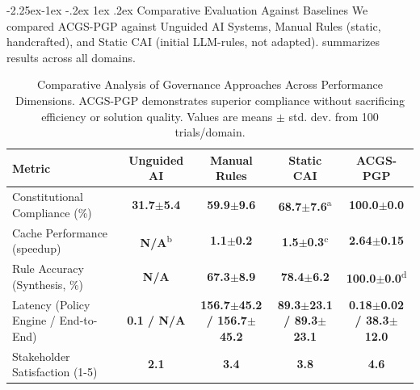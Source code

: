 \documentclass[manuscript,screen,9pt]{acmart}
\makeatletter
\renewcommand\subsection{\@startsection{subsection}{2}{\z@}%
  {-2.25ex\@plus -1ex \@minus -.2ex}%
  {1ex \@plus .2ex}%
  {\normalfont\large\bfseries}}
\newcommand{\tablesize}{\footnotesize}
\newcommand{\tablenumfmt}[1]{\textbf{#1}}
\newcommand{\tableheader}[1]{\textbf{#1}}
\makeatother
\begin{document}
\subsection{Comparative Evaluation Against Baselines}
\label{subsec:comparative_evaluation}
We compared ACGS-PGP against Unguided AI Systems, Manual Rules (static, handcrafted), and Static CAI (initial LLM-rules, not adapted).  summarizes results across all domains.
\begin{table}[htbp]
	\centering
	\caption{Comparative Analysis of Governance Approaches Across Performance Dimensions. ACGS-PGP demonstrates superior compliance without sacrificing efficiency or solution quality. Values are means $\pm$ std. dev. from 100 trials/domain.}
	\label{tab:baseline_comparison}
	\tablesize
	\begin{tabular}{@{}lcccc@{}}
		\toprule
		\tableheader{Metric}                 & \tableheader{Unguided AI}            & \tableheader{Manual Rules}                    & \tableheader{Static CAI}                      & \tableheader{ACGS-PGP}                                  \\
		\midrule
		Constitutional Compliance (\%)       & \tablenumfmt{31.7$\pm$5.4}           & \tablenumfmt{59.9$\pm$9.6}                    & \tablenumfmt{68.7$\pm$7.6}\textsuperscript{a} & \textbf{\tablenumfmt{100.0$\pm$0.0}}                    \\
		Cache Performance (speedup)          & \tablenumfmt{N/A}\textsuperscript{b} & \tablenumfmt{1.1$\pm$0.2}                     & \tablenumfmt{1.5$\pm$0.3}\textsuperscript{c}  & \textbf{\tablenumfmt{2.64$\pm$0.15}}                    \\
		Rule Accuracy (Synthesis, \%)        & \tablenumfmt{N/A}                    & \tablenumfmt{67.3$\pm$8.9}                    & \tablenumfmt{78.4$\pm$6.2}                    & \textbf{\tablenumfmt{100.0$\pm$0.0}}\textsuperscript{d} \\
		Latency (Policy Engine / End-to-End) & \tablenumfmt{0.1 / N/A}              & \tablenumfmt{156.7$\pm$45.2 / 156.7$\pm$45.2} & \tablenumfmt{89.3$\pm$23.1 / 89.3$\pm$23.1}   & \textbf{\tablenumfmt{0.18$\pm$0.02 / 38.3$\pm$12.0}}    \\
		Stakeholder Satisfaction (1-5)       & \tablenumfmt{2.1}                    & \tablenumfmt{3.4}                             & \tablenumfmt{3.8}                             & \textbf{\tablenumfmt{4.6}}                              \\
		\bottomrule
	\end{tabular}

\end{table}
\end{document}

